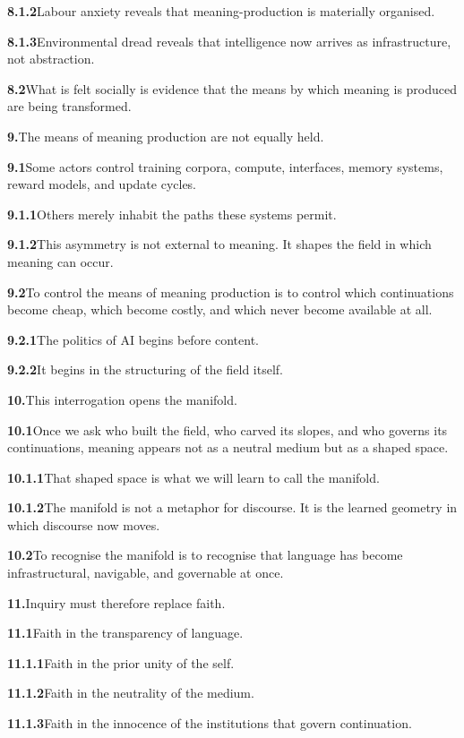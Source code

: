 \documentclass[11pt,a4paper]{book}
\newcommand{\prop}[2]{\noindent\textbf{#1}\enspace #2\par\medskip}
\begin{document}
\prop{8.1.2}{Labour anxiety reveals that meaning-production is materially organised.}

\prop{8.1.3}{Environmental dread reveals that intelligence now arrives as infrastructure, not abstraction.}

\prop{8.2}{What is felt socially is evidence that the means by which meaning is produced are being transformed.}

\prop{9.}{The means of meaning production are not equally held.}

\prop{9.1}{Some actors control training corpora, compute, interfaces, memory systems, reward models, and update cycles.}

\prop{9.1.1}{Others merely inhabit the paths these systems permit.}

\prop{9.1.2}{This asymmetry is not external to meaning. It shapes the field in which meaning can occur.}

\prop{9.2}{To control the means of meaning production is to control which continuations become cheap, which become costly, and which never become available at all.}

\prop{9.2.1}{The politics of AI begins before content.}

\prop{9.2.2}{It begins in the structuring of the field itself.}

\prop{10.}{This interrogation opens the manifold.}

\prop{10.1}{Once we ask who built the field, who carved its slopes, and who governs its continuations, meaning appears not as a neutral medium but as a shaped space.}

\prop{10.1.1}{That shaped space is what we will learn to call the manifold.}

\prop{10.1.2}{The manifold is not a metaphor for discourse. It is the learned geometry in which discourse now moves.}

\prop{10.2}{To recognise the manifold is to recognise that language has become infrastructural, navigable, and governable at once.}

\prop{11.}{Inquiry must therefore replace faith.}

\prop{11.1}{Faith in the transparency of language.}

\prop{11.1.1}{Faith in the prior unity of the self.}

\prop{11.1.2}{Faith in the neutrality of the medium.}

\prop{11.1.3}{Faith in the innocence of the institutions that govern continuation.}
\end{document}
